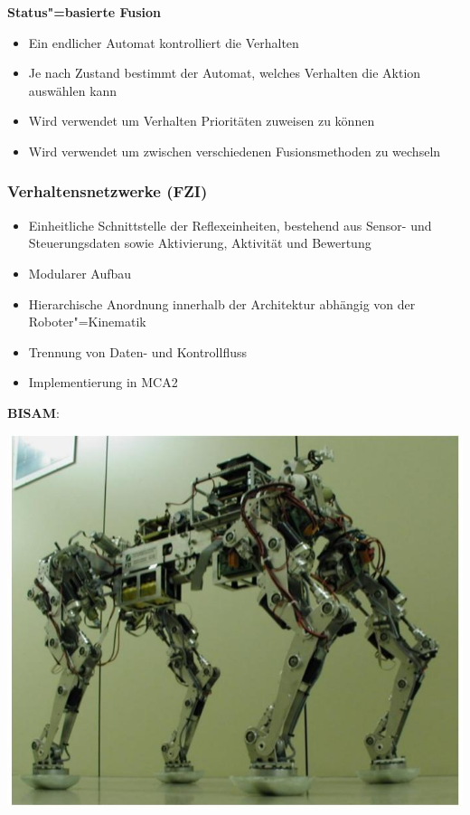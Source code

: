 \textbf{Status"=basierte Fusion}
\begin{itemize}
	\item Ein endlicher Automat kontrolliert die Verhalten
	\item Je nach Zustand bestimmt der Automat, welches Verhalten die Aktion auswählen kann
	\item Wird verwendet um Verhalten Prioritäten zuweisen zu können
	\item Wird verwendet um zwischen verschiedenen Fusionsmethoden zu wechseln
\end{itemize}

\subsubsection{Verhaltensnetzwerke (FZI)}
\begin{itemize}
	\item Einheitliche Schnittstelle der Reflexeinheiten, bestehend aus Sensor- und Steuerungsdaten sowie Aktivierung, Aktivität und Bewertung
	\item Modularer Aufbau
	\item Hierarchische Anordnung innerhalb der Architektur abhängig von der Roboter"=Kinematik
	\item Trennung von Daten- und Kontrollfluss
	\item Implementierung in MCA2
\end{itemize}

\textbf{BISAM}:\\
\begin{center}
\includegraphics[width=.5\textwidth]{figures/bisam.png}
\end{center}